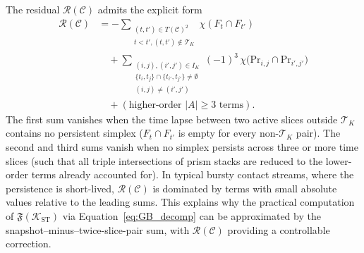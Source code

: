 \documentclass[
    pre,
    twocolumn,
    superscriptaddress,
    showpacs,
    nofootinbib,
    amsmath,
    amssymb,
    floatfix
]{revtex4-2}
\newcommand{\K}{\mathcal{K}}
\theoremstyle{plain} %
\theoremstyle{definition} %
\begin{document}
The residual $\mathcal{R}(\mathcal{C})$ admits the explicit form
\begin{align}\label{eq:R_explicit}
    \mathcal{R}(\mathcal{C})
    &= -\!\!\sum_{\substack{(t, t') \in T(\mathcal{C})^2 \\ t < t', (t, t') \notin \mathcal{T}_K}}\!\!
            \chi(F_t \cap F_{t'}) \nonumber \\
    &\quad +\!\!\sum_{\substack{(i,j),(i',j') \in I_K \\ \{t_i, t_j\} \cap \{t_{i'}, t_{j'}\} \neq \emptyset \\ (i,j) \neq (i', j')}}\!\!
        (-1)^3\,\chi\bigl(\mathrm{Pr}_{i,j} \cap \mathrm{Pr}_{i',j'}\bigr) \nonumber \\
    &\quad + (\text{higher-order } |A| \ge 3 \text{ terms}).
\end{align}
The first sum vanishes when the time lapse between two active slices outside $\mathcal{T}_K$ contains no persistent simplex ($F_t \cap F_{t'}$ is empty for every non-$\mathcal{T}_K$ pair).
The second and third sums vanish when no simplex persists across three or more time slices (such that all triple intersections of prism stacks are reduced to the lower-order terms already accounted for).
In typical bursty contact streams, where the persistence is short-lived, $\mathcal{R}(\mathcal{C})$ is dominated by terms with small absolute values relative to the leading sums.
This explains why the practical computation of $\mathfrak{F}(\K_{\mathrm{ST}})$ via Equation~\eqref{eq:GB_decomp} can be approximated by the snapshot--minus--twice-slice-pair sum, with $\mathcal{R}(\mathcal{C})$ providing a controllable correction.



\end{document}
